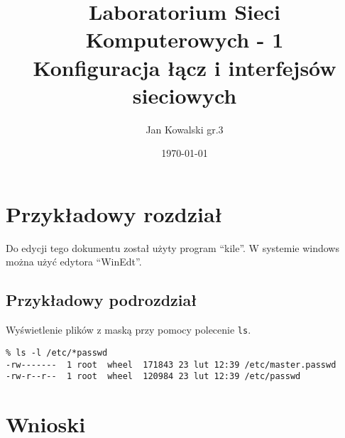\documentclass[a4paper,11pt,notitlepage]{article}
\author{Jan Kowalski gr.3}
\title{Laboratorium Sieci Komputerowych - 1 \\ {\small Konfiguracja łącz i interfejsów sieciowych}}
\date{\today}
\begin{document}
\maketitle
\tableofcontents

\section{Przykładowy rozdział}
Do edycji tego dokumentu został użyty program ``kile''. W systemie windows można użyć edytora ``WinEdt''.

\subsection{Przykładowy podrozdział}
Wyświetlenie plików z maską przy pomocy polecenie \verb+ls+.
\footnotesize\begin{verbatim}
% ls -l /etc/*passwd
-rw-------  1 root  wheel  171843 23 lut 12:39 /etc/master.passwd
-rw-r--r--  1 root  wheel  120984 23 lut 12:39 /etc/passwd
\end{verbatim}

\section{Wnioski}
\end{document}
